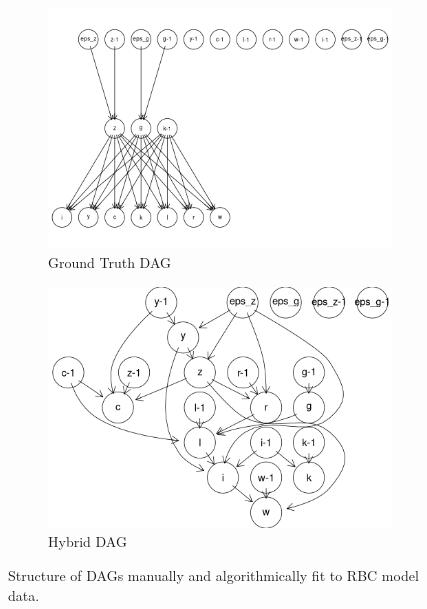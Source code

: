 \documentclass{article}
\begin{document}
\begin{figure}

  \centering
  \begin{subfigure}{0.6\textwidth}
    \centering
    \includegraphics[width=\linewidth]{images/rbc_true_dag.png} 
    \caption{Ground Truth DAG}
    \label{gtdag}
  \end{subfigure}
  \begin{subfigure}{0.6\textwidth}
    \centering  
    \includegraphics[width=\linewidth]{images/rbc_hybrid_dag.png}
    \caption{Hybrid DAG}
    \label{hdag}
  \end{subfigure}

  \caption{Structure of DAGs manually and algorithmically fit to RBC model data.}
  \label{rbcdags}
\end{figure}
\end{document}
